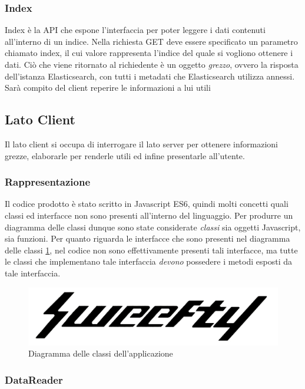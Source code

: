 \subsubsection{Index}
Index è la API che espone l'interfaccia per poter leggere i dati contenuti all'interno di un indice. Nella richiesta GET deve essere specificato un parametro chiamato index, il cui valore rappresenta l'indice del quale si vogliono ottenere i dati. Ciò che viene ritornato al richiedente è un oggetto \emph{grezzo}, ovvero la risposta dell'istanza Elasticsearch, con tutti i metadati che Elasticsearch utilizza annessi. Sarà compito del client reperire le informazioni a lui utili

\subsection{Lato Client}
Il lato client si occupa di interrogare il lato server per ottenere informazioni grezze, elaborarle per renderle utili ed infine presentarle all'utente.

\label{sec:Componenti}
\subsubsection{Rappresentazione}
Il codice prodotto è stato scritto in Javascript ES6, quindi molti concetti quali classi ed interfacce non sono presenti all'interno del linguaggio. Per produrre un diagramma delle classi dunque sono state considerate \emph{ classi } sia oggetti Javascript, sia funzioni. Per quanto riguarda le interfacce che sono presenti nel diagramma delle classi \ref{diagrammaClassi}, nel codice non sono effettivamente presenti tali interfacce, ma tutte le classi che implementano tale interfaccia \emph{devono} possedere i metodi esposti da tale interfaccia.

\begin{figure}[H]
    \label{diagrammaClassi}
    \centering
    \includegraphics[width=1\textwidth]{Images/logo.jpg}
    \caption{Diagramma delle classi dell'applicazione}
\end{figure}

\subsubsection{DataReader}
\label{sec:DataReader}
